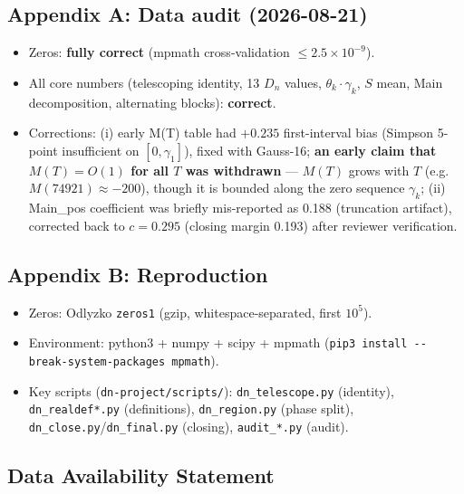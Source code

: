 \documentclass[
]{article}
\providecommand{\tightlist}{%
  \setlength{\itemsep}{0pt}\setlength{\parskip}{0pt}}
\begin{document}
\hypertarget{appendix-a-data-audit-2026-08-21}{%
\subsection{Appendix A: Data audit
(2026-08-21)}\label{appendix-a-data-audit-2026-08-21}}

\begin{itemize}
\tightlist
\item
  Zeros: \textbf{fully correct} (mpmath cross-validation
  \(\le 2.5\times10^{-9}\)).
\item
  All core numbers (telescoping identity, 13 \(D_n\) values,
  \(\theta_k\cdot\gamma_k\), \(S\) mean, Main decomposition, alternating
  blocks): \textbf{correct}.
\item
  Corrections: (i) early M(T) table had \(+0.235\) first-interval bias
  (Simpson 5-point insufficient on \([0,\gamma_1]\)), fixed with
  Gauss-16; \textbf{an early claim that \(M(T)=O(1)\) for all \(T\) was
  withdrawn} --- \(M(T)\) grows with \(T\)
  (e.g.~\(M(74921)\approx -200\)), though it is bounded along the zero
  sequence \(\gamma_k\); (ii) Main\_pos coefficient was briefly
  mis-reported as 0.188 (truncation artifact), corrected back to
  \(c = 0.295\) (closing margin 0.193) after reviewer verification.
\end{itemize}

\hypertarget{appendix-b-reproduction}{%
\subsection{Appendix B: Reproduction}\label{appendix-b-reproduction}}

\begin{itemize}
\tightlist
\item
  Zeros: Odlyzko \texttt{zeros1} (gzip, whitespace-separated, first
  \(10^5\)).
\item
  Environment: python3 + numpy + scipy + mpmath
  (\texttt{pip3\ install\ -\/-break-system-packages\ mpmath}).
\item
  Key scripts (\texttt{dn-project/scripts/}): \texttt{dn\_telescope.py}
  (identity), \texttt{dn\_realdef*.py} (definitions),
  \texttt{dn\_region.py} (phase split),
  \texttt{dn\_close.py}/\texttt{dn\_final.py} (closing),
  \texttt{audit\_*.py} (audit).
\end{itemize}

\hypertarget{data-availability-statement}{%
\subsection{Data Availability
Statement}\label{data-availability-statement}}
\end{document}
